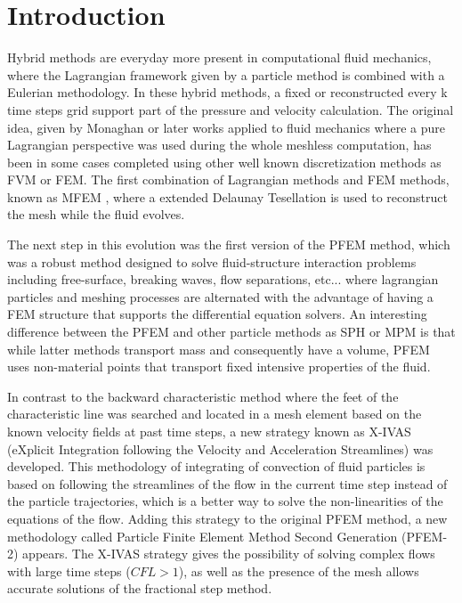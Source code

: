 \documentclass[a4paper,conference]{IEEEtran}
\begin{document}
\section{Introduction}

Hybrid methods are everyday more present in computational fluid mechanics, where the Lagrangian framework given by a particle method is combined with a Eulerian methodology. In these hybrid methods, a fixed or reconstructed every k time steps grid support part of the pressure and velocity calculation. The original idea, given by Monaghan \cite{Mon77} or later works applied to fluid mechanics \cite{Monaghan88} where a pure Lagrangian perspective was used during the whole meshless computation, has been in some cases completed using other well known discretization methods as FVM\cite{Nestor20091733} or FEM\cite{Ide03}. The first combination of Lagrangian methods and FEM methods, known as MFEM \cite{Ide03b}, where a extended Delaunay Tesellation is used to reconstruct the mesh while the fluid evolves.

The next step in this evolution was the first version of the PFEM method\cite{Idelsohn04}, which was a robust method designed to solve fluid-structure interaction problems including free-surface, breaking waves, flow separations, etc... where lagrangian particles and meshing processes are alternated with the advantage of having a FEM structure that supports the differential equation solvers. An interesting difference between the PFEM and other particle methods as SPH or MPM\cite{Wieckowsky04} is that while latter methods transport mass and consequently have a volume, PFEM uses non-material points that transport fixed intensive properties of the fluid.

In contrast to the backward characteristic method where the feet of the characteristic line was searched and located in a mesh element based on the known velocity fields at past time steps, a new strategy known as X-IVAS (eXplicit Integration following the Velocity and Acceleration Streamlines) was developed\cite{Idelsohn12}. This methodology of integrating of convection of fluid particles is based on following the streamlines of the flow in the current time step instead of the particle trajectories, which is a better way to solve the non-linearities of the equations of the flow. Adding this strategy to the original PFEM method, a new methodology called Particle Finite Element Method Second Generation (PFEM-2)\cite{Idelsohn12b} appears. The X-IVAS strategy gives the possibility of solving complex flows with large time steps ($CFL>1$), as well as the presence of the mesh allows accurate solutions of the fractional step method.
\end{document}
